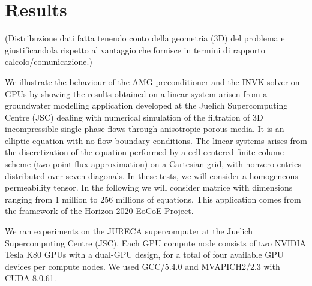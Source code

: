 \section{Results}
(Distribuzione dati fatta tenendo conto della geometria (3D) del problema e giustificandola rispetto al vantaggio che fornisce in termini di rapporto calcolo/comunicazione.)

We illustrate the behaviour of the AMG preconditioner and the INVK solver on GPUs  by showing the results obtained on a linear system arisen from a groundwater modelling application developed at the Juelich Supercomputing Centre (JSC)  dealing with numerical simulation of the filtration of 3D incompressible single-phase flows through anisotropic porous media. It is an elliptic equation with no flow boundary conditions. The linear systems arises from the discretization of the equation performed by a cell-centered finite colume scheme (two-point flux approximation) on a Cartesian grid, with nonzero entries distributed over seven diagonals. In these tests, we will consider a homogeneous permeability tensor. In the following we will consider matrice with dimensions ranging from 1 million to 256 millions of equations.  
This application comes from the framework of the Horizon 2020 EoCoE Project.

We ran experiments on the JURECA supercomputer at the Juelich Supercomputing Centre (JSC).  Each GPU compute node consists of two NVIDIA Tesla K80 GPUs with a dual-GPU design, for a total of four available GPU devices per compute nodes. 
We used GCC/5.4.0 and MVAPICH2/2.3 with CUDA 8.0.61.
